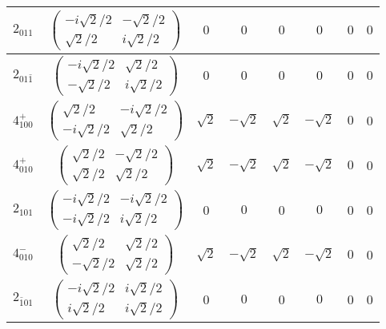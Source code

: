 \documentclass[3p,preprint]{elsarticle}
\begin{document}
\begin{table}[H]
\begin{tabular}{|c|c||c|c|c|c|c|c|}
			$2_{011}$ &		$\left(\begin{array}{cc} -i\sqrt{2}/2&-\sqrt{2}/2 \\ \sqrt{2}/2&i\sqrt{2}/2 \end{array}\right)$	&$0$ & $0$ & $0$ & $0$ & $0$ & $0$ \\ \hline
			$2_{01\bar{1}}$ &		$\left(\begin{array}{cc} -i\sqrt{2}/2&\sqrt{2}/2 \\ -\sqrt{2}/2&i\sqrt{2}/2 \end{array}\right)$	&$0$ & $0$ & $0$ & $0$ & $0$ & $0$ \\ \hline
			$4^{+}_{100}$ &		$\left(\begin{array}{cc} \sqrt{2}/2&-i\sqrt{2}/2 \\ -i\sqrt{2}/2&\sqrt{2}/2 \end{array}\right)$	&$\sqrt{2}$ & $-\sqrt{2}$ & $\sqrt{2}$ & $-\sqrt{2}$ & $0$ & 0 \\ \hline
			$4^{+}_{010}$ &		$\left(\begin{array}{cc} \sqrt{2}/2&-\sqrt{2}/2 \\ \sqrt{2}/2&\sqrt{2}/2 \end{array}\right)$	&$\sqrt{2}$ & $-\sqrt{2}$ & $\sqrt{2}$ & $-\sqrt{2}$ & $0$ & 0 \\ \hline
			$2_{101}$ &		$\left(\begin{array}{cc} -i\sqrt{2}/2&-i\sqrt{2}/2 \\ -i\sqrt{2}/2&i\sqrt{2}/2 \end{array}\right)$	&0 & $0$ & 0 & $0$ & 0 & 0 \\ \hline
			$4^{-}_{010}$ &		$\left(\begin{array}{cc} \sqrt{2}/2&\sqrt{2}/2 \\ -\sqrt{2}/2&\sqrt{2}/2 \end{array}\right)$	&$\sqrt{2}$ & $-\sqrt{2}$ & $\sqrt{2}$ & $-\sqrt{2}$ & $0$ & 0 \\ \hline
			$2_{\bar{1}01}$ &		$\left(\begin{array}{cc} -i\sqrt{2}/2&i\sqrt{2}/2 \\ i\sqrt{2}/2&i\sqrt{2}/2 \end{array}\right)$	&0 & $0$ & 0 & $0$ & 0 & 0 \\ \hline
	\end{tabular}
\end{table}
\end{document}
